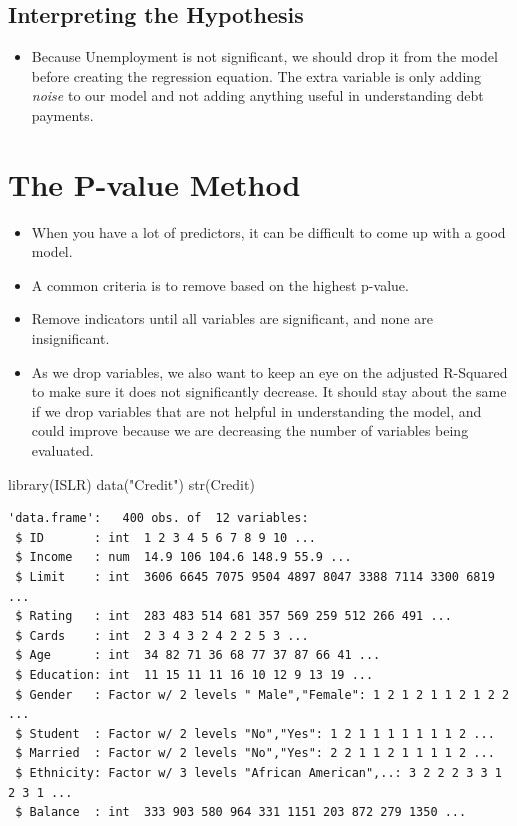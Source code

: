 \documentclass[
  letterpaper,
  DIV=11,
  numbers=noendperiod]{scrreprt}
\newenvironment{Shaded}{\begin{snugshade}}{\end{snugshade}}
\newcommand{\FunctionTok}[1]{\textcolor[rgb]{0.28,0.35,0.67}{#1}}
\newcommand{\NormalTok}[1]{\textcolor[rgb]{0.00,0.23,0.31}{#1}}
\newcommand{\StringTok}[1]{\textcolor[rgb]{0.13,0.47,0.30}{#1}}
\providecommand{\tightlist}{%
  \setlength{\itemsep}{0pt}\setlength{\parskip}{0pt}}\usepackage{longtable,booktabs,array}
\begin{document}
\subsection{Interpreting the
Hypothesis}\label{interpreting-the-hypothesis-1}

\begin{itemize}
\tightlist
\item
  Because Unemployment is not significant, we should drop it from the
  model before creating the regression equation. The extra variable is
  only adding \emph{noise} to our model and not adding anything useful
  in understanding debt payments.
\end{itemize}

\section{The P-value Method}\label{the-p-value-method}

\begin{itemize}
\item
  When you have a lot of predictors, it can be difficult to come up with
  a good model.
\item
  A common criteria is to remove based on the highest p-value.
\item
  Remove indicators until all variables are significant, and none are
  insignificant.
\item
  As we drop variables, we also want to keep an eye on the adjusted
  R-Squared to make sure it does not significantly decrease. It should
  stay about the same if we drop variables that are not helpful in
  understanding the model, and could improve because we are decreasing
  the number of variables being evaluated.
\end{itemize}

\begin{Shaded}
\begin{Highlighting}[]
\FunctionTok{library}\NormalTok{(ISLR)}
\FunctionTok{data}\NormalTok{(}\StringTok{"Credit"}\NormalTok{)}
\FunctionTok{str}\NormalTok{(Credit)}
\end{Highlighting}
\end{Shaded}

\begin{verbatim}
'data.frame':   400 obs. of  12 variables:
 $ ID       : int  1 2 3 4 5 6 7 8 9 10 ...
 $ Income   : num  14.9 106 104.6 148.9 55.9 ...
 $ Limit    : int  3606 6645 7075 9504 4897 8047 3388 7114 3300 6819 ...
 $ Rating   : int  283 483 514 681 357 569 259 512 266 491 ...
 $ Cards    : int  2 3 4 3 2 4 2 2 5 3 ...
 $ Age      : int  34 82 71 36 68 77 37 87 66 41 ...
 $ Education: int  11 15 11 11 16 10 12 9 13 19 ...
 $ Gender   : Factor w/ 2 levels " Male","Female": 1 2 1 2 1 1 2 1 2 2 ...
 $ Student  : Factor w/ 2 levels "No","Yes": 1 2 1 1 1 1 1 1 1 2 ...
 $ Married  : Factor w/ 2 levels "No","Yes": 2 2 1 1 2 1 1 1 1 2 ...
 $ Ethnicity: Factor w/ 3 levels "African American",..: 3 2 2 2 3 3 1 2 3 1 ...
 $ Balance  : int  333 903 580 964 331 1151 203 872 279 1350 ...
\end{verbatim}
\end{document}
